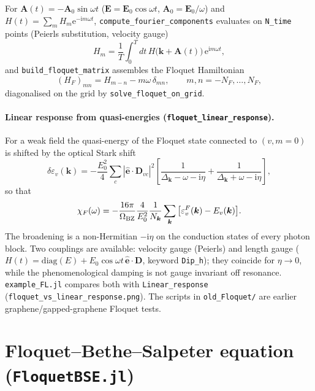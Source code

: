 \documentclass[11pt,a4paper]{article}
\newcommand{\ii}{\mathrm{i}}
\newcommand{\ee}{\mathrm{e}}
\newcommand{\kk}{\bm{k}}
\newcommand{\hate}{\hat{\bm{e}}}
\newcommand{\code}[1]{\texttt{#1}}
\newcommand{\Nk}{N_{\bm k}}
\begin{document}
For $\bm A(t)=-\bm A_0\sin\omega t$ ($\bm E=\bm E_0\cos\omega t$, $\bm A_0=\bm E_0/\omega$) and $H(t)=\sum_mH_m\ee^{-\ii m\omega t}$,
\code{compute\_fourier\_components} evaluates on \code{N\_time} points (Peierls substitution, velocity gauge)
\begin{equation}
H_m=\frac1T\int_0^T\!dt\,H\big(\kk+\bm A(t)\big)\,\ee^{\ii m\omega t},
\end{equation}
and
\code{build\_floquet\_matrix} assembles the Floquet Hamiltonian
\begin{equation}
(H_F)_{mn}=H_{m-n}-m\omega\,\delta_{mn},\qquad m,n=-N_F,\dots,N_F,
\label{eq:HF}
\end{equation}
diagonalised on the grid by \code{solve\_floquet\_on\_grid}.

\paragraph{Linear response from quasi-energies (\code{floquet\_linear\_response}).}
For a weak field the quasi-energy of the Floquet state connected to $(v,m=0)$ is shifted by the optical Stark shift
\begin{equation}
\delta\varepsilon_v(\kk)=-\frac{E_0^2}{4}\sum_c|\hate\cdot\bm D_{vc}|^2\left[\frac{1}{\Delta_{\kk}-\omega-\ii\eta}+\frac{1}{\Delta_{\kk}+\omega-\ii\eta}\right],
\end{equation}
so that
\begin{equation}
\chi_F(\omega)=-\frac{16\pi}{\Omega_{\rm BZ}}\frac{4}{E_0^2}\frac{1}{\Nk}\sum_{\kk}\big[\varepsilon^F_v(\kk)-E_v(\kk)\big].
\end{equation}
The broadening is a non-Hermitian $-\ii\eta$ on the conduction states of every photon block. Two couplings are available: velocity gauge (Peierls)
and length gauge ($H(t)=\mathrm{diag}(E)+E_0\cos\omega t\,\hate\cdot\bm D$, keyword \code{Dip\_h}); they coincide for $\eta\to0$, while the
phenomenological damping is not gauge invariant off resonance. \code{example\_FL.jl} compares both with \code{Linear\_response}
(\code{floquet\_vs\_linear\_response.png}). The scripts in \code{old\_Floquet/} are earlier graphene/gapped-graphene Floquet tests.

\section{Floquet--Bethe--Salpeter equation (\code{FloquetBSE.jl})}
\label{sec:flbse}
\end{document}
